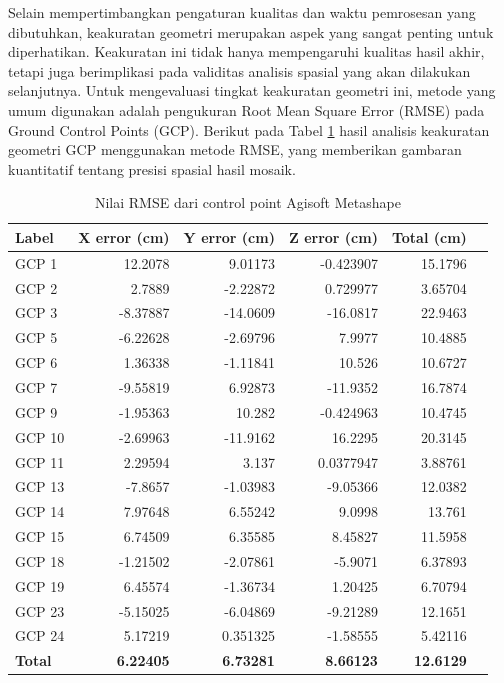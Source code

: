 Selain mempertimbangkan pengaturan kualitas dan waktu pemrosesan yang dibutuhkan, keakuratan geometri merupakan aspek yang sangat penting untuk diperhatikan. Keakuratan ini tidak hanya mempengaruhi kualitas hasil akhir, tetapi juga berimplikasi pada validitas analisis spasial yang akan dilakukan selanjutnya. Untuk mengevaluasi tingkat keakuratan geometri ini, metode yang umum digunakan adalah pengukuran Root Mean Square Error (RMSE) pada Ground Control Points (GCP). Berikut pada Tabel \ref{tab:gcp_error} hasil analisis keakuratan geometri GCP menggunakan metode RMSE, yang memberikan gambaran kuantitatif tentang presisi spasial hasil mosaik.



\begin{table}[h]
\centering
\renewcommand{\arraystretch}{1.2}
\caption{Nilai RMSE dari control point Agisoft Metashape}
\begin{tabular}{|l|r|r|r|r|r|}
\hline
\textbf{Label} & \textbf{X error (cm)} & \textbf{Y error (cm)} & \textbf{Z error (cm)} & \textbf{Total (cm)} \\
\hline
GCP 1 & 12.2078 & 9.01173 & -0.423907 & 15.1796 \\
\hline
GCP 2 & 2.7889 & -2.22872 & 0.729977 & 3.65704 \\
\hline
GCP 3 & -8.37887 & -14.0609 & -16.0817 & 22.9463 \\
\hline
GCP 5 & -6.22628 & -2.69796 & 7.9977 & 10.4885 \\
\hline
GCP 6 & 1.36338 & -1.11841 & 10.526 & 10.6727 \\
\hline
GCP 7 & -9.55819 & 6.92873 & -11.9352 & 16.7874 \\
\hline
GCP 9 & -1.95363 & 10.282 & -0.424963 & 10.4745 \\
\hline
GCP 10 & -2.69963 & -11.9162 & 16.2295 & 20.3145 \\
\hline
GCP 11 & 2.29594 & 3.137 & 0.0377947 & 3.88761 \\
\hline
GCP 13 & -7.8657 & -1.03983 & -9.05366 & 12.0382 \\
\hline
GCP 14 & 7.97648 & 6.55242 & 9.0998 & 13.761 \\
\hline
GCP 15 & 6.74509 & 6.35585 & 8.45827 & 11.5958 \\
\hline
GCP 18 & -1.21502 & -2.07861 & -5.9071 & 6.37893 \\
\hline
GCP 19 & 6.45574 & -1.36734 & 1.20425 & 6.70794 \\
\hline
GCP 23 & -5.15025 & -6.04869 & -9.21289 & 12.1651 \\
\hline
GCP 24 & 5.17219 & 0.351325 & -1.58555 & 5.42116 \\
\hline
\textbf{Total} & \textbf{6.22405} & \textbf{6.73281} & \textbf{8.66123} & \textbf{12.6129} \\
\hline
\end{tabular}
\label{tab:gcp_error}
\end{table}

